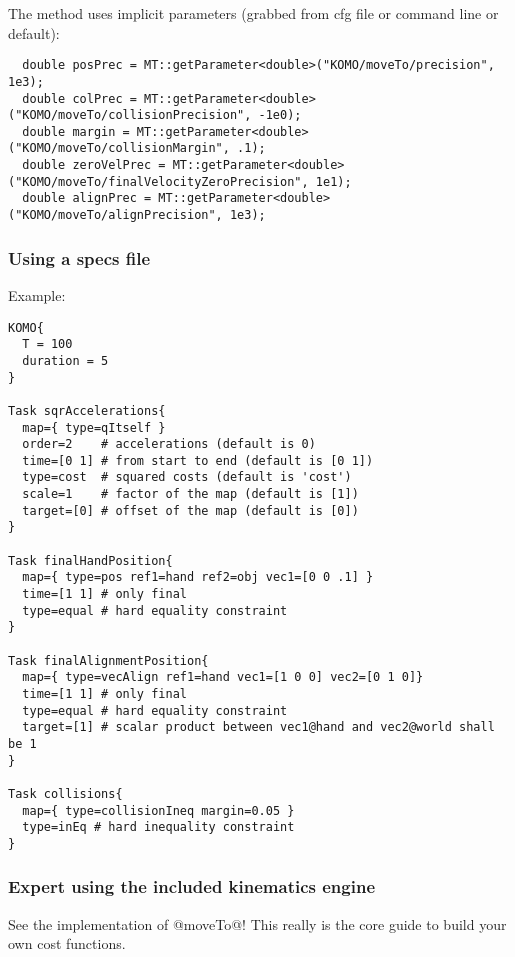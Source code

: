 \documentclass[10pt,fleqn,twoside]{article}
\begin{document}
{{The method uses implicit parameters (grabbed from cfg file or command line or default):
\begin{code}
\begin{verbatim}
  double posPrec = MT::getParameter<double>("KOMO/moveTo/precision", 1e3);
  double colPrec = MT::getParameter<double>("KOMO/moveTo/collisionPrecision", -1e0);
  double margin = MT::getParameter<double>("KOMO/moveTo/collisionMargin", .1);
  double zeroVelPrec = MT::getParameter<double>("KOMO/moveTo/finalVelocityZeroPrecision", 1e1);
  double alignPrec = MT::getParameter<double>("KOMO/moveTo/alignPrecision", 1e3);
\end{verbatim}
\end{code}


\subsubsection{Using a specs file}

Example:
\begin{code}
\begin{verbatim}
KOMO{
  T = 100
  duration = 5
}

Task sqrAccelerations{
  map={ type=qItself }
  order=2    # accelerations (default is 0)
  time=[0 1] # from start to end (default is [0 1])
  type=cost  # squared costs (default is 'cost')
  scale=1    # factor of the map (default is [1])
  target=[0] # offset of the map (default is [0])
}

Task finalHandPosition{
  map={ type=pos ref1=hand ref2=obj vec1=[0 0 .1] }
  time=[1 1] # only final
  type=equal # hard equality constraint
}

Task finalAlignmentPosition{
  map={ type=vecAlign ref1=hand vec1=[1 0 0] vec2=[0 1 0]}
  time=[1 1] # only final
  type=equal # hard equality constraint
  target=[1] # scalar product between vec1@hand and vec2@world shall be 1
}

Task collisions{
  map={ type=collisionIneq margin=0.05 }
  type=inEq # hard inequality constraint
}
\end{verbatim}
\end{code}



\subsubsection{Expert using the included kinematics engine}

See the implementation of @moveTo@! This really is the core guide to
build your own cost functions.

}}
\end{document}
